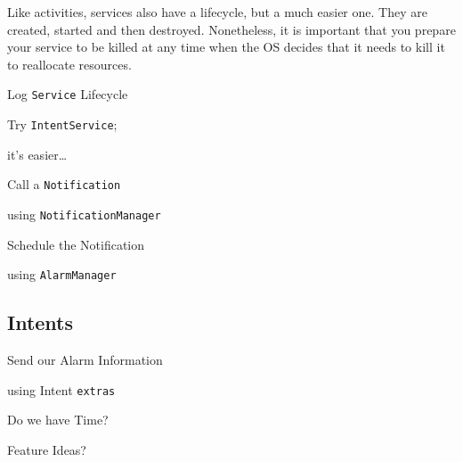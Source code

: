 \documentclass[a4paper,slides=slides,handouts=handouts]{mh-presentation}       %
\begin{document}
	\begin{summary}
		Like activities, services also have a lifecycle, but a much easier one.
		They are created, started and then destroyed. Nonetheless, it is
		important that you prepare your service to be killed at any time when
		the OS decides that it needs to kill it to reallocate resources.
	\end{summary}
	
	\begin{slide}
		{\Huge Log \verb~Service~ Lifecycle}
	\end{slide}
	
	\begin{slide}
		{\Huge Try \verb~IntentService~;}
		
		\vspace{3mm}
		
		{\Huge it's easier\ldots}
	\end{slide}
	
	\begin{slide}
		{\Huge Call a \verb~Notification~}
		
		\vspace{3mm}
		
		{\Huge using \verb~NotificationManager~}
	\end{slide}
	
	\showPreviousPreviousSlide\showPreviousSlide\showThisSlide
	\vspace{4mm}
	
	\begin{slide}
		{\Huge Schedule the Notification}
		
		\vspace{3mm}
		
		{\Huge using \verb~AlarmManager~}
	\end{slide}
	
	\showThisSlide

\subsection{Intents} %

	\begin{slide}
		{\Huge Send our Alarm Information}
		
		\vspace{3mm}
		
		{\Huge using Intent \verb~extras~}
	\end{slide}
	
	\begin{slide}
		{\Huge Do we have Time?}
		
		\pause
		
		\vspace{3mm}
		
		{\Huge Feature Ideas?}
	\end{slide}
	
\end{document}
